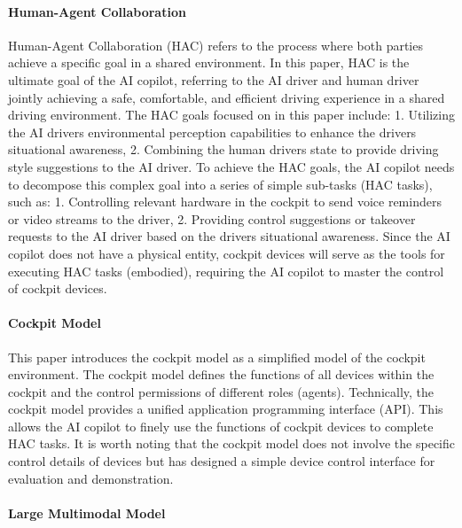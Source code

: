 \documentclass[
]{article}
\begin{document}
\paragraph{Human-Agent Collaboration}\label{human-agent-collaboration}

Human-Agent Collaboration (HAC) refers to the process where both parties
achieve a specific goal in a shared environment. In this paper, HAC is
the ultimate goal of the AI copilot, referring to the AI driver and
human driver jointly achieving a safe, comfortable, and efficient
driving experience in a shared driving environment. The HAC goals
focused on in this paper include: 1. Utilizing the AI
driver\textquotesingle s environmental perception capabilities to
enhance the driver\textquotesingle s situational awareness, 2. Combining
the human driver\textquotesingle s state to provide driving style
suggestions to the AI driver. To achieve the HAC goals, the AI copilot
needs to decompose this complex goal into a series of simple sub-tasks
(HAC tasks), such as: 1. Controlling relevant hardware in the cockpit to
send voice reminders or video streams to the driver, 2. Providing
control suggestions or takeover requests to the AI driver based on the
driver\textquotesingle s situational awareness. Since the AI copilot
does not have a physical entity, cockpit devices will serve as the tools
for executing HAC tasks (embodied), requiring the AI copilot to master
the control of cockpit devices.

\paragraph{Cockpit Model}\label{cockpit-model}

This paper introduces the cockpit model as a simplified model of the
cockpit environment. The cockpit model defines the functions of all
devices within the cockpit and the control permissions of different
roles (agents). Technically, the cockpit model provides a unified
application programming interface (API). This allows the AI copilot to
finely use the functions of cockpit devices to complete HAC tasks. It is
worth noting that the cockpit model does not involve the specific
control details of devices but has designed a simple device control
interface for evaluation and demonstration.

\paragraph{Large Multimodal Model}\label{large-multimodal-model}
\end{document}
